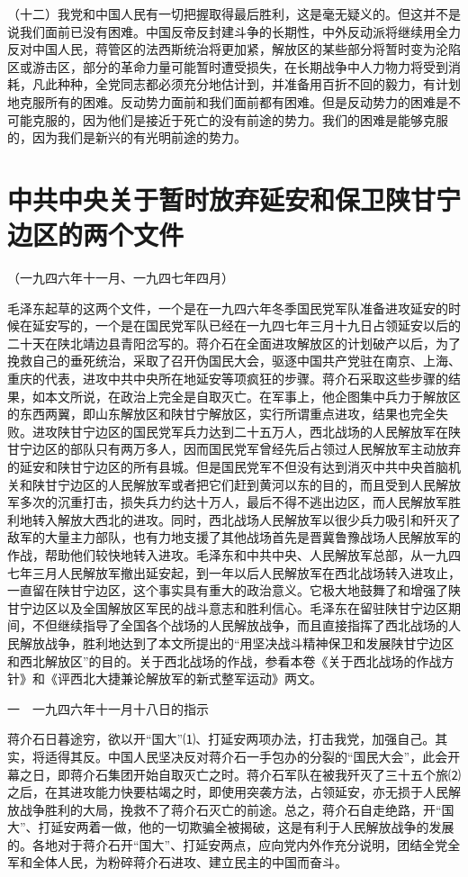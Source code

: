 \documentclass[UTF-8, a5paper, 12pt]{ctexart}
\begin{document}
（十二）我党和中国人民有一切把握取得最后胜利，这是毫无疑义的。但这并不是说我们面前已没有困难。中国反帝反封建斗争的长期性，中外反动派将继续用全力反对中国人民，蒋管区的法西斯统治将更加紧，解放区的某些部分将暂时变为沦陷区或游击区，部分的革命力量可能暂时遭受损失，在长期战争中人力物力将受到消耗，凡此种种，全党同志都必须充分地估计到，并准备用百折不回的毅力，有计划地克服所有的困难。反动势力面前和我们面前都有困难。但是反动势力的困难是不可能克服的，因为他们是接近于死亡的没有前途的势力。我们的困难是能够克服的，因为我们是新兴的有光明前途的势力。

\section{中共中央关于暂时放弃延安和保卫陕甘宁边区的两个文件}

（一九四六年十一月、一九四七年四月）

毛泽东起草的这两个文件，一个是在一九四六年冬季国民党军队准备进攻延安的时候在延安写的，一个是在国民党军队已经在一九四七年三月十九日占领延安以后的二十天在陕北靖边县青阳岔写的。蒋介石在全面进攻解放区的计划破产以后，为了挽救自己的垂死统治，采取了召开伪国民大会，驱逐中国共产党驻在南京、上海、重庆的代表，进攻中共中央所在地延安等项疯狂的步骤。蒋介石采取这些步骤的结果，如本文所说，在政治上完全是自取灭亡。在军事上，他企图集中兵力于解放区的东西两翼，即山东解放区和陕甘宁解放区，实行所谓重点进攻，结果也完全失败。进攻陕甘宁边区的国民党军兵力达到二十五万人，西北战场的人民解放军在陕甘宁边区的部队只有两万多人，因而国民党军曾经先后占领过人民解放军主动放弃的延安和陕甘宁边区的所有县城。但是国民党军不但没有达到消灭中共中央首脑机关和陕甘宁边区的人民解放军或者把它们赶到黄河以东的目的，而且受到人民解放军多次的沉重打击，损失兵力约达十万人，最后不得不逃出边区，而人民解放军胜利地转入解放大西北的进攻。同时，西北战场人民解放军以很少兵力吸引和歼灭了敌军的大量主力部队，也有力地支援了其他战场首先是晋冀鲁豫战场人民解放军的作战，帮助他们较快地转入进攻。毛泽东和中共中央、人民解放军总部，从一九四七年三月人民解放军撤出延安起，到一年以后人民解放军在西北战场转入进攻止，一直留在陕甘宁边区，这个事实具有重大的政治意义。它极大地鼓舞了和增强了陕甘宁边区以及全国解放区军民的战斗意志和胜利信心。毛泽东在留驻陕甘宁边区期间，不但继续指导了全国各个战场的人民解放战争，而且直接指挥了西北战场的人民解放战争，胜利地达到了本文所提出的“用坚决战斗精神保卫和发展陕甘宁边区和西北解放区”的目的。关于西北战场的作战，参看本卷《关于西北战场的作战方针》和《评西北大捷兼论解放军的新式整军运动》两文。

一　一九四六年十一月十八日的指示

蒋介石日暮途穷，欲以开“国大”⑴、打延安两项办法，打击我党，加强自己。其实，将适得其反。中国人民坚决反对蒋介石一手包办的分裂的“国民大会”，此会开幕之日，即蒋介石集团开始自取灭亡之时。蒋介石军队在被我歼灭了三十五个旅⑵之后，在其进攻能力快要枯竭之时，即使用突袭方法，占领延安，亦无损于人民解放战争胜利的大局，挽救不了蒋介石灭亡的前途。总之，蒋介石自走绝路，开“国大”、打延安两着一做，他的一切欺骗全被揭破，这是有利于人民解放战争的发展的。各地对于蒋介石开“国大”、打延安两点，应向党内外作充分说明，团结全党全军和全体人民，为粉碎蒋介石进攻、建立民主的中国而奋斗。
\end{document}
